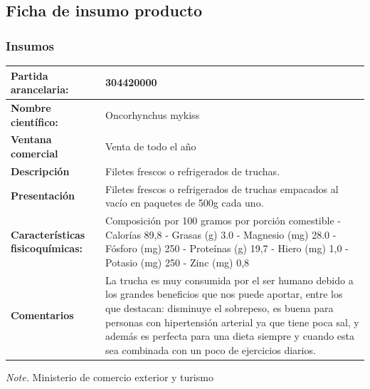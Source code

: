 \documentclass[
  stu,
  floatsintext,
  longtable,
  a4paper,
  nolmodern,
  notxfonts,
  notimes,
  colorlinks=true,linkcolor=blue,citecolor=blue,urlcolor=blue]{apa7}
\begin{document}
\subsection{Ficha de insumo producto}\label{ficha-de-insumo-producto}

\subsubsection{Insumos}\label{insumos}

\begin{table}

{\caption{{Ficha de insumo producto}{\label{tbl-mytable2}}}}

\begin{longtable}[]{@{}
  >{\raggedright\arraybackslash}p{}
  >{\raggedright\arraybackslash}p{}@{}}
\toprule\noalign{}
\begin{minipage}[b]{\linewidth}\raggedright
\textbf{Partida arancelaria:}
\end{minipage} & \begin{minipage}[b]{\linewidth}\raggedright
304420000
\end{minipage} \\
\midrule\noalign{}
\endhead
\bottomrule\noalign{}
\endlastfoot
\textbf{Nombre científico:} & Oncorhynchus mykiss \\
\textbf{Ventana comercial} & Venta de todo el año \\
\textbf{Descripción} & Filetes frescos o refrigerados de truchas. \\
\textbf{Presentación} & Filetes frescos o refrigerados de truchas
empacados al vacío en paquetes de 500g cada uno. \\
\textbf{Características fisicoquímicas:} & Composición por 100 gramos
por porción comestible - Calorías 89,8 - Grasas (g) 3.0 - Magnesio (mg)
28.0 - Fósforo (mg) 250 - Proteínas (g) 19,7 - Hiero (mg) 1,0 - Potasio
(mg) 250 - Zinc (mg) 0,8 \\
\textbf{Comentarios} & La trucha es muy consumida por el ser humano
debido a los grandes beneficios que nos puede aportar, entre los que
destacan: disminuye el sobrepeso, es buena para personas con
hipertensión arterial ya que tiene poca sal, y además es perfecta para
una dieta siempre y cuando esta sea combinada con un poco de ejercicios
diarios. \\
\end{longtable}

{\noindent \emph{Note.} Ministerio de comercio exterior y turismo}

\end{table}
\end{document}
